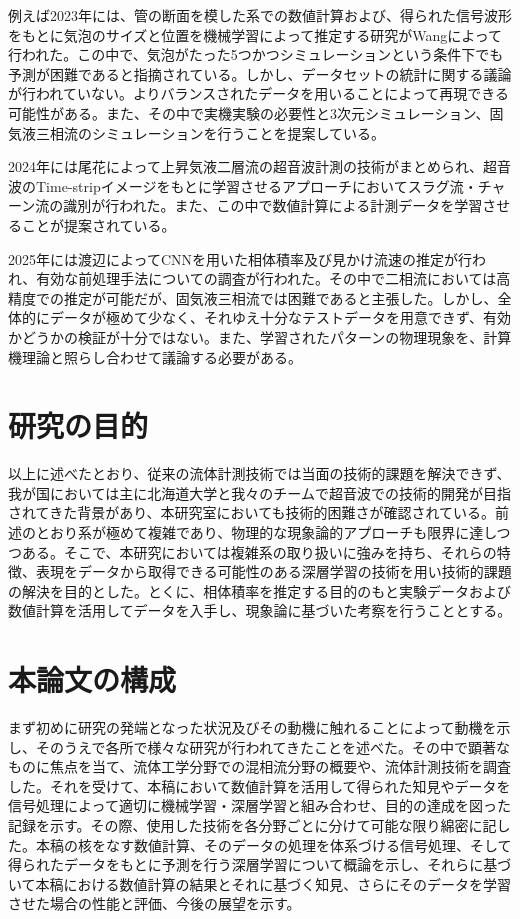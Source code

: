 \documentclass[uplatex]{suribt}
\begin{document}
例えば2023年には、管の断面を模した系での数値計算および、得られた信号波形をもとに気泡のサイズと位置を機械学習によって推定する研究がWangによって行われた。この中で、気泡がたった5つかつシミュレーションという条件下でも予測が困難であると指摘されている。しかし、データセットの統計に関する議論が行われていない。よりバランスされたデータを用いることによって再現できる可能性がある。また、その中で実機実験の必要性と3次元シミュレーション、固気液三相流のシミュレーションを行うことを提案している。\par
2024年には尾花によって上昇気液二層流の超音波計測の技術がまとめられ、超音波のTime-stripイメージをもとに学習させるアプローチにおいてスラグ流・チャーン流の識別が行われた。また、この中で数値計算による計測データを学習させることが提案されている。\par
2025年には渡辺によってCNNを用いた相体積率及び見かけ流速の推定が行われ、有効な前処理手法についての調査が行われた。その中で二相流においては高精度での推定が可能だが、固気液三相流では困難であると主張した。しかし、全体的にデータが極めて少なく、それゆえ十分なテストデータを用意できず、有効かどうかの検証が十分ではない。また、学習されたパターンの物理現象を、計算機理論と照らし合わせて議論する必要がある。

\section{研究の目的}
以上に述べたとおり、従来の流体計測技術では当面の技術的課題を解決できず、我が国においては主に北海道大学と我々のチームで超音波での技術的開発が目指されてきた背景があり、本研究室においても技術的困難さが確認されている。前述のとおり系が極めて複雑であり、物理的な現象論的アプローチも限界に達しつつある。そこで、本研究においては複雑系の取り扱いに強みを持ち、それらの特徴、表現をデータから取得できる可能性のある深層学習の技術を用い技術的課題の解決を目的とした。とくに、相体積率を推定する目的のもと実験データおよび数値計算を活用してデータを入手し、現象論に基づいた考察を行うこととする。
\section{本論文の構成}
まず初めに研究の発端となった状況及びその動機に触れることによって動機を示し、そのうえで各所で様々な研究が行われてきたことを述べた。その中で顕著なものに焦点を当て、流体工学分野での混相流分野の概要や、流体計測技術を調査した。それを受けて、本稿において数値計算を活用して得られた知見やデータを信号処理によって適切に機械学習・深層学習と組み合わせ、目的の達成を図った記録を示す。その際、使用した技術を各分野ごとに分けて可能な限り綿密に記した。本稿の核をなす数値計算、そのデータの処理を体系づける信号処理、そして得られたデータをもとに予測を行う深層学習について概論を示し、それらに基づいて本稿における数値計算の結果とそれに基づく知見、さらにそのデータを学習させた場合の性能と評価、今後の展望を示す。
\end{document}
